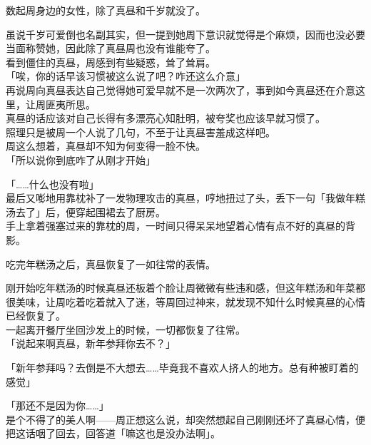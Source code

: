 数起周身边的女性，除了真昼和千岁就没了。

虽说千岁可爱倒也名副其实，但一提到她周下意识就觉得是个麻烦，因而也没必要当面称赞她，因此除了真昼周也没有谁能夸了。\\

看到僵住的真昼，周感到有些疑惑，耸了耸肩。\\

「唉，你的话早该习惯被这么说了吧？咋还这么介意」\\

再说周向真昼表达自己觉得她可爱早就不是一次两次了，事到如今真昼还在介意这里，让周匪夷所思。\\

真昼的话应该对自己长得有多漂亮心知肚明，被夸奖也应该早就习惯了。\\

照理只是被周一个人说了几句，不至于让真昼害羞成这样吧。\\

周这么想着，真昼却不知为何变得一脸不快。\\

「所以说你到底咋了从刚才开始」

「……什么也没有啦」\\

最后又嘭地用靠枕补了一发物理攻击的真昼，哼地扭过了头，丢下一句「我做年糕汤去了」后，便穿起围裙去了厨房。\\

手上拿着强塞过来的靠枕的周，一时间只得呆呆地望着心情有点不好的真昼的背影。\\

\vspace{2\baselineskip}

吃完年糕汤之后，真昼恢复了一如往常的表情。

刚开始吃年糕汤的时候真昼还板着个脸让周微微有些违和感，但这年糕汤和年菜都很美味，让周吃着吃着就入了迷，等周回过神来，就发现不知什么时候真昼的心情已经恢复了。\\

一起离开餐厅坐回沙发上的时候，一切都恢复了往常。\\

「说起来啊真昼，新年参拜你去不？」

「新年参拜吗？去倒是不大想去……毕竟我不喜欢人挤人的地方。总有种被盯着的感觉」

「那还不是因为你……」\\

是个不得了的美人啊——周正想这么说，却突然想起自己刚刚还坏了真昼心情，便把这话咽了回去，回答道「嘛这也是没办法啊」。\\

